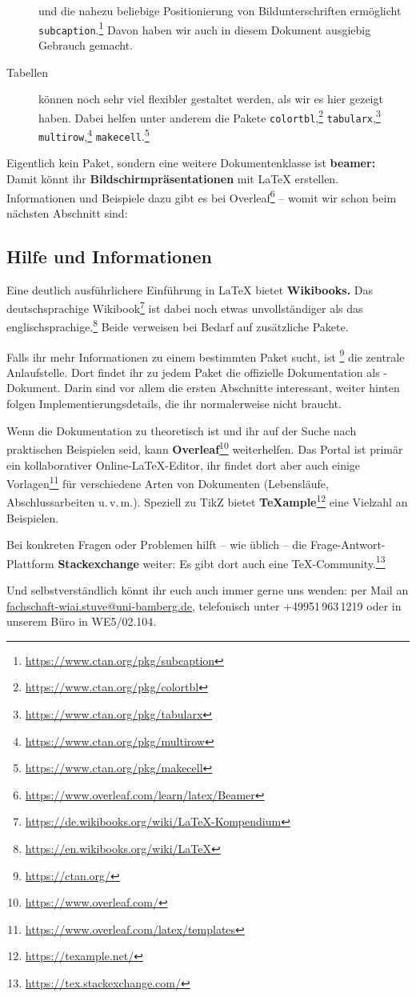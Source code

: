 \begin{description}
		und die nahezu beliebige Positionierung von Bildunterschriften ermöglicht \texttt{subcaption}.\footnote{\url{https://www.ctan.org/pkg/subcaption}}
		Davon haben wir auch in diesem Dokument ausgiebig Gebrauch gemacht.
	\item[Tabellen]
		können noch sehr viel flexibler gestaltet werden, als wir es hier gezeigt haben.
		Dabei helfen unter anderem die Pakete 
		\texttt{colortbl},\footnote{\url{https://www.ctan.org/pkg/colortbl}}
		\texttt{tabularx},\footnote{\url{https://www.ctan.org/pkg/tabularx}}
		\texttt{multirow},\footnote{\url{https://www.ctan.org/pkg/multirow}}
		\texttt{makecell}.\footnote{\url{https://www.ctan.org/pkg/makecell}}
\end{description}

\noindent Eigentlich kein Paket, sondern eine weitere Dokumentenklasse ist \textbf{beamer:} Damit könnt ihr \textbf{Bildschirmpräsentationen} mit \LaTeX{} erstellen.
Informationen und Beispiele dazu gibt es bei Overleaf\footnote{\url{https://www.overleaf.com/learn/latex/Beamer}} –
womit wir schon beim nächsten Abschnitt sind:

\subsection{Hilfe und Informationen}

Eine deutlich ausführlichere Einführung in \LaTeX{} bietet \textbf{Wikibooks.}
Das deutschsprachige Wikibook\footnote{\url{https://de.wikibooks.org/wiki/LaTeX-Kompendium}} ist dabei noch etwas unvollständiger als das englischsprachige.\footnote{\url{https://en.wikibooks.org/wiki/LaTeX}}
Beide verweisen bei Bedarf auf zusätzliche Pakete.

Falls ihr mehr Informationen zu einem bestimmten Paket sucht, ist \footnote{\url{https://ctan.org/}} die zentrale Anlaufstelle.
Dort findet ihr zu jedem Paket die offizielle Dokumentation als -Dokument.
Darin sind vor allem die ersten Abschnitte interessant, weiter hinten folgen Implementierungsdetails, die ihr normalerweise nicht braucht.

Wenn die Dokumentation zu theoretisch ist und ihr auf der Suche nach praktischen Beispielen seid, kann \textbf{Overleaf}\footnote{\url{https://www.overleaf.com/}} weiterhelfen.
Das Portal ist primär ein kollaborativer Online-\LaTeX-Editor, ihr findet dort aber auch einige Vorlagen\footnote{\url{https://www.overleaf.com/latex/templates}} für verschiedene Arten von Dokumenten (Lebensläufe, Abschlussarbeiten u.\,v.\,m.).
Speziell zu TikZ bietet \textbf{\TeX{}ample}\footnote{\url{https://texample.net/}} eine Vielzahl an Beispielen.

Bei konkreten Fragen oder Problemen hilft – wie üblich – die Frage-Antwort-Plattform \textbf{Stackexchange} weiter:
Es gibt dort auch eine \TeX-Community.\footnote{\url{https://tex.stackexchange.com/}}

Und selbstverständlich könnt ihr euch auch immer gerne uns wenden:
per Mail an \href{mailto:fachschaft-wiai.stuve@uni-bamberg.de}{fachschaft-wiai.stuve@uni-bamberg.de}, telefonisch unter +49951\,963\,1219 oder in unserem Büro in WE5/02.104.

